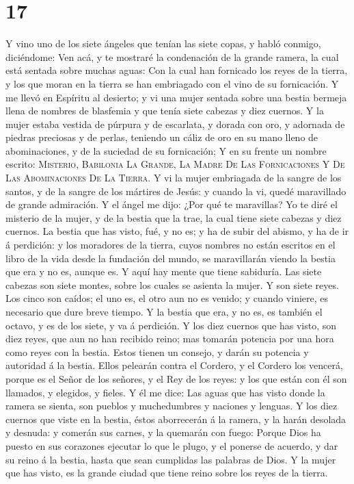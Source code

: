 \hypertarget{section-16}{%
\section{17}\label{section-16}}

 Y vino uno de los siete ángeles que tenían las siete
copas, y habló conmigo, diciéndome: Ven acá, y te mostraré la
condenación de la grande ramera, la cual está sentada sobre muchas
aguas:  Con la cual han fornicado los reyes de la tierra,
y los que moran en la tierra se han embriagado con el vino de su
fornicación.  Y me llevó en Espíritu al desierto; y vi una
mujer sentada sobre una bestia bermeja llena de nombres de blasfemia y
que tenía siete cabezas y diez cuernos.  Y la mujer estaba
vestida de púrpura y de escarlata, y dorada con oro, y adornada de
piedras preciosas y de perlas, teniendo un cáliz de oro en su mano lleno
de abominaciones, y de la suciedad de su fornicación;  Y
en su frente un nombre escrito: \textsc{Misterio}, \textsc{Babilonia}
\textsc{La} \textsc{Grande}, \textsc{La} \textsc{Madre} \textsc{De}
\textsc{Las} \textsc{Fornicaciones} Y \textsc{De} \textsc{Las}
\textsc{Abominaciones} \textsc{De} \textsc{La} \textsc{Tierra}.
 Y vi la mujer embriagada de la sangre de los santos, y de
la sangre de los mártires de Jesús: y cuando la vi, quedé maravillado de
grande admiración.  Y el ángel me dijo: ¿Por qué te
maravillas? Yo te diré el misterio de la mujer, y de la bestia que la
trae, la cual tiene siete cabezas y diez cuernos.  La
bestia que has visto, fué, y no es; y ha de subir del abismo, y ha de ir
á perdición: y los moradores de la tierra, cuyos nombres no están
escritos en el libro de la vida desde la fundación del mundo, se
maravillarán viendo la bestia que era y no es, aunque es. 
Y aquí hay mente que tiene sabiduría. Las siete cabezas son siete
montes, sobre los cuales se asienta la mujer.  Y son
siete reyes. Los cinco son caídos; el uno es, el otro aun no es venido;
y cuando viniere, es necesario que dure breve tiempo.  Y
la bestia que era, y no es, es también el octavo, y es de los siete, y
va á perdición.  Y los diez cuernos que has visto, son
diez reyes, que aun no han recibido reino; mas tomarán potencia por una
hora como reyes con la bestia.  Estos tienen un consejo,
y darán su potencia y autoridad á la bestia.  Ellos
pelearán contra el Cordero, y el Cordero los vencerá, porque es el Señor
de los señores, y el Rey de los reyes: y los que están con él son
llamados, y elegidos, y fieles.  Y él me dice: Las aguas
que has visto donde la ramera se sienta, son pueblos y muchedumbres y
naciones y lenguas.  Y los diez cuernos que viste en la
bestia, éstos aborrecerán á la ramera, y la harán desolada y desnuda: y
comerán sus carnes, y la quemarán con fuego:  Porque Dios
ha puesto en sus corazones ejecutar lo que le plugo, y el ponerse de
acuerdo, y dar su reino á la bestia, hasta que sean cumplidas las
palabras de Dios.  Y la mujer que has visto, es la grande
ciudad que tiene reino sobre los reyes de la tierra.

